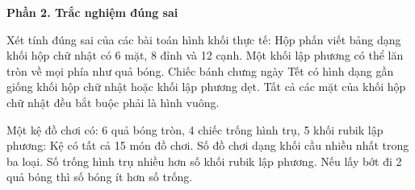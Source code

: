 \textbf{Phần 2. Trắc nghiệm đúng sai}

\begin{ex} %
Xét tính đúng sai của các bài toán hình khối thực tế:
\choiceTF
{\True Hộp phấn viết bảng dạng khối hộp chữ nhật có 6 mặt, 8 đỉnh và 12 cạnh.}
{Một khối lập phương có thể lăn tròn về mọi phía như quả bóng.}
{\True Chiếc bánh chưng ngày Tết có hình dạng gần giống khối hộp chữ nhật hoặc khối lập phương dẹt.}
{Tất cả các mặt của khối hộp chữ nhật đều bắt buộc phải là hình vuông.}
\end{ex}

\begin{ex} %
Một kệ đồ chơi có: 6 quả bóng tròn, 4 chiếc trống hình trụ, 5 khối rubik lập phương:
\choiceTF
{\True Kệ có tất cả 15 món đồ chơi.}
{\True Số đồ chơi dạng khối cầu nhiều nhất trong ba loại.}
{Số trống hình trụ nhiều hơn số khối rubik lập phương.}
{Nếu lấy bớt đi 2 quả bóng thì số bóng ít hơn số trống.}
\end{ex}


